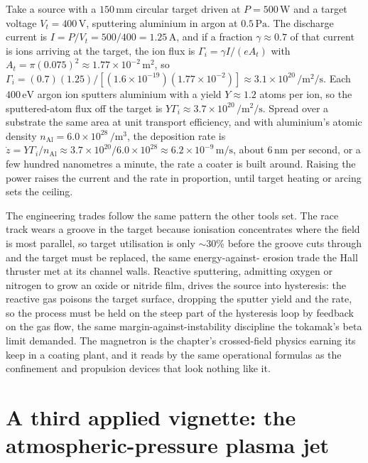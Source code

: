 

Take a source with a $150\,\si{\milli\meter}$ circular target driven at
$P = 500\,\si{\watt}$ and a target voltage $V_t = 400\,\si{\volt}$, sputtering
aluminium in argon at $0.5\,\si{\pascal}$. The discharge current is $I = P/V_t =
500/400 = 1.25\,\si{\ampere}$, and if a fraction $\gamma \approx 0.7$ of that
current is ions arriving at the target, the ion flux is $\Gamma_i = \gamma I/(e
A_t)$ with $A_t = \pi(0.075)^{2} \approx 1.77\times 10^{-2}\,\si{\meter\squared}$,
so $\Gamma_i = (0.7)(1.25)/[(1.6\times 10^{-19})(1.77\times 10^{-2})] \approx
3.1\times 10^{20}\,\si{\per\meter\squared\per\second}$. Each $400\,\si{
\electronvolt}$ argon ion sputters aluminium with a yield $Y \approx 1.2$ atoms
per ion, so the sputtered-atom flux off the target is $Y\Gamma_i \approx
3.7\times 10^{20}\,\si{\per\meter\squared\per\second}$. Spread over a substrate
the same area at unit transport efficiency, and with aluminium's atomic density
$n_{\mathrm{Al}} = 6.0\times 10^{28}\,\si{\per\meter\cubed}$, the deposition rate
is $\dot{z} = Y\Gamma_i/n_{\mathrm{Al}} \approx 3.7\times 10^{20}/6.0\times
10^{28} \approx 6.2\times 10^{-9}\,\si{\meter\per\second}$, about $6\,\si{\nano
\meter}$ per second, or a few hundred nanometres a minute, the rate a coater is
built around. Raising the power raises the current and the rate in proportion,
until target heating or arcing sets the ceiling.

The engineering trades follow the same pattern the other tools set. The race
track wears a groove in the target because ionisation concentrates where the
field is most parallel, so target utilisation is only $\sim 30\%$ before the
groove cuts through and the target must be replaced, the same energy-against-
erosion trade the Hall thruster met at its channel walls. Reactive sputtering,
admitting oxygen or nitrogen to grow an oxide or nitride film, drives the source
into hysteresis: the reactive gas poisons the target surface, dropping the
sputter yield and the rate, so the process must be held on the steep part of the
hysteresis loop by feedback on the gas flow, the same margin-against-instability
discipline the tokamak's beta limit demanded. The magnetron is the chapter's
crossed-field physics earning its keep in a coating plant, and it reads by the
same operational formulas as the confinement and propulsion devices that look
nothing like it.

\section{A third applied vignette: the atmospheric-pressure plasma jet}

